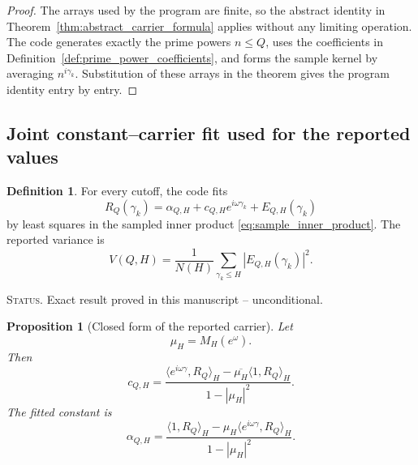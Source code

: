 \documentclass[11pt]{amsart}
\numberwithin{equation}{section}
\theoremstyle{plain}
\newtheorem{proposition}[theorem]{Proposition}
\theoremstyle{definition}
\newtheorem{definition}[theorem]{Definition}
\theoremstyle{remark}
\newcommand{\1}{\mathbf{1}}
\newcommand{\statusnote}[1]{%
  \par\smallskip\noindent
  \begingroup\footnotesize\textsc{Status.} #1\endgroup
  \par\smallskip}
\begin{document}
\begin{proof}
The arrays used by the program are finite, so the abstract identity in
Theorem~\ref{thm:abstract_carrier_formula} applies without any limiting
operation.  The code generates exactly the prime powers \(n\leq Q\), uses
the coefficients in Definition~\ref{def:prime_power_coefficients}, and
forms the sample kernel by averaging \(n^{i\gamma_k}\).  Substitution of
these arrays in the theorem gives the program identity entry by entry.
\end{proof}

\subsection{Joint constant--carrier fit used for the reported values}
\label{subsec:numerical_joint_fit}

\begin{definition}
\label{def:numerical_joint_fit}
For every cutoff, the code fits
\begin{equation}
R_Q(\gamma_k)
=
\alpha_{Q,H}+c_{Q,H}e^{i\omega\gamma_k}+E_{Q,H}(\gamma_k)
\label{eq:numerical_joint_model}
\end{equation}
by least squares in the sampled inner product
\eqref{eq:sample_inner_product}.  The reported variance is
\begin{equation}
V(Q,H)
=
\frac1{N(H)}
\sum_{\gamma_k\leq H}|E_{Q,H}(\gamma_k)|^2.
\label{eq:numerical_reported_variance}
\end{equation}
\end{definition}

\statusnote{Exact result proved in this manuscript -- unconditional.}
\begin{proposition}[Closed form of the reported carrier]
\label{prop:numerical_joint_carrier}
Let
\begin{equation}
\mu_H=M_H(e^\omega).
\label{eq:numerical_muH}
\end{equation}
Then
\begin{equation}
\boxed{
c_{Q,H}
=
\frac{
\langle e^{i\omega\gamma},R_Q\rangle_H
-
\overline{\mu_H}\langle1,R_Q\rangle_H
}{1-|\mu_H|^2}.
}
\label{eq:numerical_joint_carrier}
\end{equation}
The fitted constant is
\begin{equation}
\alpha_{Q,H}
=
\frac{
\langle1,R_Q\rangle_H
-
\mu_H\langle e^{i\omega\gamma},R_Q\rangle_H
}{1-|\mu_H|^2}.
\label{eq:numerical_joint_constant}
\end{equation}
\end{proposition}
\end{document}
